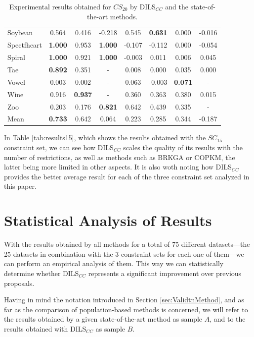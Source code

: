 \documentclass[review]{elsarticle}
\begin{document}
\begin{table}[!h]
{\begin{tabular}{lccccccc}
			Soybean & 0.564 & 0.416 & -0.218 & 0.545 & \textbf{0.631} & 0.000 & -0.016 \\
			Spectfheart & \textbf{1.000} & 0.953 & \textbf{1.000} & -0.107 & -0.112 & 0.000 & -0.054 \\
			Spiral & \textbf{1.000} & 0.921 & \textbf{1.000} & -0.003 & 0.011 & 0.006 & 0.045 \\
			Tae & \textbf{0.892} & 0.351 & - & 0.008 & 0.000 & 0.035 & 0.000 \\
			Vowel & 0.003 & 0.002 & - & 0.063 & -0.003 & \textbf{0.071} & - \\
			Wine & 0.916 & \textbf{0.937} & - & 0.360 & 0.363 & 0.380 & 0.015 \\
			Zoo & 0.203 & 0.176 & \textbf{0.821} & 0.642 & 0.439 & 0.335 & - \\
			\hline
			Mean & \textbf{0.733} & 0.642 & 0.064 & 0.223 & 0.285 & 0.344 & -0.187 \\
			\hline
			
		\end{tabular}}
		
	\caption{Experimental results obtained for $CS_{20}$ by DILS$_{CC}$ and the state-of-the-art methods.}
	\label{tab:results20}
\end{table}
	
In Table \ref{tab:results15}, which shows the results obtained with the $SC_{15}$ constraint set, we can see how DILS$_{CC}$ scales the quality of its results with the number of restrictions, as well as methods such as BRKGA or COPKM, the latter being more limited in other aspects. It is also woth noting how DILS$_{CC}$ provides the better average result for each of the three constraint set analyzed in this paper.
	
	
\clearpage

\section{Statistical Analysis of Results} \label{sec:analisis}

With the results obtained by all methods for a total of 75 different datasets---the 25 datasets in combination with the 3 constraint sets for each one of them---we can perform an empirical analysis of them. This way we can statistically determine whether DILS$_{CC}$ represents a significant improvement over previous proposals.

Having in mind the notation introduced in Section \ref{sec:ValidtnMethod}, and as far as the comparison of population-based methods is concerned, we will refer to the results obtained by a given state-of-the-art method as sample $A$, and to the results obtained with DILS$_{CC}$ as sample $B$.
\end{document}
